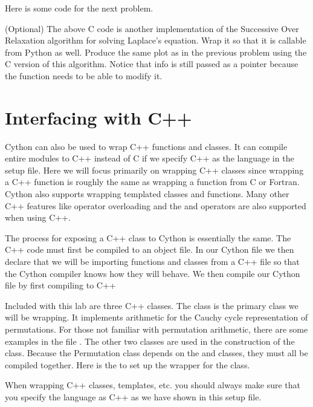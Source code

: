 Here is some code for the next problem.

\begin{problem}
(Optional)
The above C code is another implementation of the Successive Over Relaxation algorithm for solving Laplace's equation.
Wrap it so that it is callable from Python as well.
Produce the same plot as in the previous problem using the C version of this algorithm.
Notice that info is still passed as a pointer because the function needs to be able to modify it.
\end{problem}

\section*{Interfacing with C++}
Cython can also be used to wrap C++ functions and classes.
It can compile entire modules to C++ instead of C if we specify C++ as the language in the setup file.
Here we will focus primarily on wrapping C++ classes since wrapping a C++ function is roughly the same as wrapping a function from C or Fortran.
Cython also supports wrapping templated classes and functions.
Many other C++ features like operator overloading and the  and  operators are also supported when using C++.

The process for exposing a C++ class to Cython is essentially the same.
The C++ code must first be compiled to an object file.
In our Cython file we then declare that we will be importing functions and classes from a C++ file so that the Cython compiler knows how they will behave.
We then compile our Cython file by first compiling to C++

Included with this lab are three C++ classes.
The  class is the primary class we will be wrapping.
It implements arithmetic for the Cauchy cycle representation of permutations.
For those not familiar with permutation arithmetic, there are some examples in the file .
The other two classes are used in the construction of the  class.
Because the Permutation class depends on the  and  classes, they must all be compiled together.
Here is the  to set up the wrapper for the  class.



\begin{warn}
When wrapping C++ classes, templates, etc. you should always make sure that you specify the language as C++ as we have shown in this setup file.
\end{warn}


